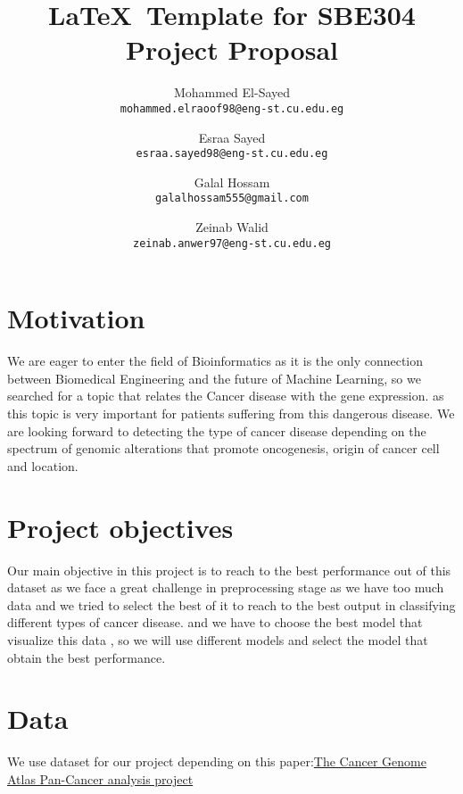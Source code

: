 \documentclass[10pt,twocolumn,letterpaper]{article}
\begin{document}
\title{\LaTeX\ Template for SBE304 Project Proposal}

\author{Mohammed El-Sayed\\
{\tt\small mohammed.elraoof98@eng-st.cu.edu.eg}
\and
Esraa Sayed\\
{\tt\small esraa.sayed98@eng-st.cu.edu.eg}
\and
Galal Hossam\\
{\tt\small galalhossam555@gmail.com}
\and
Zeinab Walid\\
{\tt\small zeinab.anwer97@eng-st.cu.edu.eg}
}

\maketitle


\section{Motivation}

We are eager to enter the field of Bioinformatics as it is the only connection between Biomedical Engineering and the future of Machine Learning, so we searched for a topic that relates the Cancer disease with the gene expression. as this topic is very important for patients suffering from this dangerous disease.
We are looking forward to detecting the type of cancer disease depending on the spectrum of genomic alterations that promote oncogenesis, origin of cancer cell and location. 


\section{Project objectives}


Our main objective in this project is to reach to the best performance out of this dataset as we face a great challenge in preprocessing stage as we have too much data and we tried to select the best of it to reach to the best output in classifying different types of cancer disease. and we have to choose the best model that visualize this data , so we will use different models and select the model that obtain the best performance. 

\section{Data}


	We use dataset for our project depending on this paper:\href{http://archive.ics.uci.edu/ml/machine-learning-databases/00401/TCGA-PANCAN-HiSeq-801x20531.tar.gz}{The Cancer Genome Atlas Pan-Cancer analysis project}
	\cite{weinstein2013cancer}
	
\end{document}
